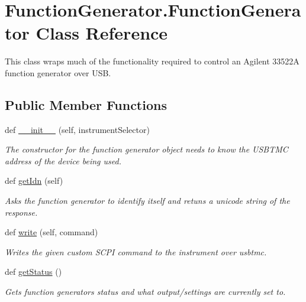\hypertarget{class_function_generator_1_1_function_generator}{}\section{Function\+Generator.\+Function\+Generator Class Reference}
\label{class_function_generator_1_1_function_generator}


This class wraps much of the functionality required to control an Agilent 33522\+A function generator over U\+S\+B.  


\subsection*{Public Member Functions}
\begin{DoxyCompactItemize}
\item 
def \hyperlink{class_function_generator_1_1_function_generator_ac556755f798d3845b3ecde0fb7338747}{\+\_\+\+\_\+init\+\_\+\+\_\+} (self, instrument\+Selector)
\begin{DoxyCompactList}\small\item\em The constructor for the function generator object needs to know the U\+S\+B\+T\+M\+C address of the device being used. \end{DoxyCompactList}\item 
def \hyperlink{class_function_generator_1_1_function_generator_a329b4c54f381abf22f1c3a106ca7a5da}{get\+Idn} (self)
\begin{DoxyCompactList}\small\item\em Asks the function generator to identify itself and retuns a unicode string of the response. \end{DoxyCompactList}\item 
def \hyperlink{class_function_generator_1_1_function_generator_a44f94d5aba0d2cc604a2c0d310090f83}{write} (self, command)
\begin{DoxyCompactList}\small\item\em Writes the given custom S\+C\+P\+I command to the instrument over usbtmc. \end{DoxyCompactList}\item 
def \hyperlink{class_function_generator_1_1_function_generator_abfe8847e48e592c1bb7779d8e0cd8720}{get\+Status} ()
\begin{DoxyCompactList}\small\item\em Gets function generator\textquotesingle{}s status and what output/settings are currently set to. \end{DoxyCompactList}\item 

\end{DoxyCompactItemize}
